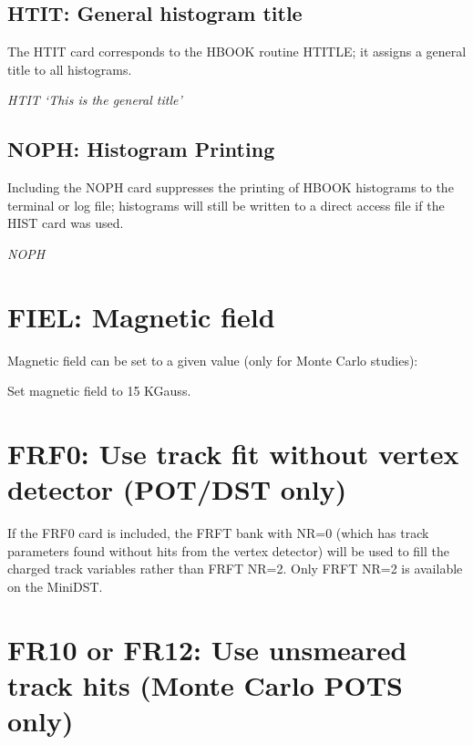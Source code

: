 \subsection{\label{sec-DCHT}HTIT: General histogram title}
\par
\par The HTIT card corresponds to the HBOOK routine HTITLE; it assigns
a general
title to all histograms.
\begin{indentlist}{ 2.50cm}{ 2.75cm}
{\it HTIT `This is the general title'}\end{indentlist}
\subsection{\label{sec-DCHP}NOPH: Histogram Printing}
\par
\par Including the NOPH card suppresses the printing
of HBOOK histograms to the terminal or log file; histograms will still
be
written to a direct access file if the HIST card was used.
\begin{indentlist}{ 2.50cm}{ 2.75cm}
{\it NOPH}\end{indentlist}
 
\par
\section{\label{sec-DCFIEL}FIEL: Magnetic field}
\par
\par Magnetic field can be set to a given value (only for Monte Carlo studies):
\begin{indentlist}{ 2.50cm}{ 2.75cm}
Set magnetic field to 15 KGauss.\end{indentlist}
\par
\section{\label{sec-FRF0}FRF0: Use track fit without vertex detector (POT/DST only)}
\par
If the FRF0 card is included,
the FRFT bank with NR=0 (which has track parameters found without
hits
from the vertex detector)
will be used to fill the charged track
variables rather than FRFT NR=2. Only FRFT NR=2 is available on the MiniDST.

\par
\section{\label{sec-FR12} FR10 or FR12: Use unsmeared track hits (Monte Carlo POTS only)}
\par

